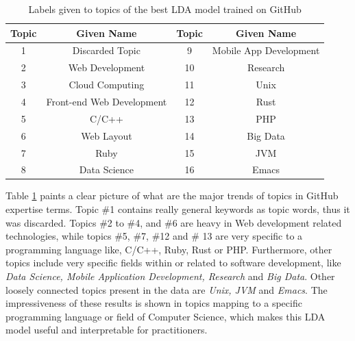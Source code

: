            \begin{table}
              \centering
              \caption{Labels given to topics of the best LDA model trained on GitHub}\label{tab:GH_LDA_labels}
                \vspace{6pt} %
              \begin{tabular}{|c c|c c|}
                \hline
                Topic & Given Name & Topic & Given Name \\
                \hline
                1 & Discarded Topic & 9 & Mobile App Development \\
                2 & Web Development & 10 & Research \\
                3 & Cloud Computing & 11 & Unix \\
                4 & Front-end Web Development & 12 & Rust \\
                5 & C/C++ & 13 & PHP \\
                6 & Web Layout & 14 & Big Data \\
                7 & Ruby & 15 & JVM \\
                8 & Data Science & 16 & Emacs \\
                \hline
              \end{tabular}%
            \end{table}
            
            Table \ref{tab:GH_LDA_labels} paints a clear picture of what are the major trends of topics in GitHub expertise terms. Topic \#1 contains really general keywords as topic words, thus it was discarded. Topics \#2 to \#4, and \#6 are heavy in Web development related technologies, while topics \#5, \#7, \#12 and \# 13 are very specific to a programming language like, C/C++, Ruby, Rust or PHP. Furthermore, other topics include very specific fields within or related to software development, like \emph{Data Science, Mobile Application Development, Research} and \emph{Big Data}. Other loosely connected topics present in the data are \emph{Unix, JVM} and \emph{Emacs}. The impressiveness of these results is shown in topics mapping to a specific programming language or field of Computer Science, which makes this LDA model useful and interpretable for practitioners.  
            
